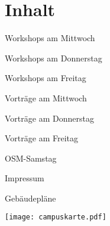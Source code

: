 \section*{Inhalt}
\label{contents}
\newlength\contentspace
\setlength\contentspace{0.2em}

\vspace*{\contentspace}%
\noindent Workshops am Mittwoch \dotfill \pageref{mittwoch-workshops}

\vspace*{\contentspace}%
\noindent Workshops am Donnerstag \dotfill \pageref{donnerstag-workshops}

\vspace*{\contentspace}%
\noindent Workshops am Freitag \dotfill \pageref{freitag-workshops}

\vspace*{\contentspace}%
\noindent Vorträge am Mittwoch \dotfill \pageref{mittwoch}

\vspace*{\contentspace}%
\noindent Vorträge am Donnerstag \dotfill \pageref{donnerstag}

\vspace*{\contentspace}%
\noindent Vorträge am Freitag \dotfill \pageref{freitag}

\vspace*{\contentspace}%
\noindent OSM-Samstag \dotfill \pageref{osm-samstag}

\vspace*{\contentspace}%
\noindent Impressum \dotfill \pageref{impressum}

\vspace*{\contentspace}%
\noindent Gebäudepläne \dotfill \pageref{kartenseiten}

\vfill
\noindent
\texttt{[image: campuskarte.pdf]}

\newpage

